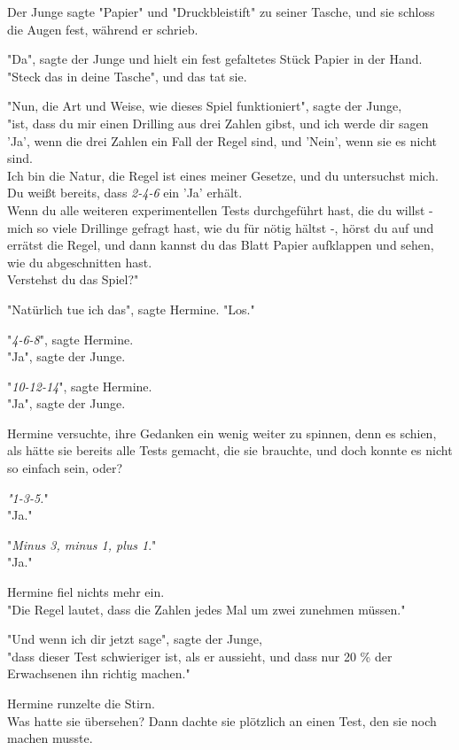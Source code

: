 {Der Junge sagte "Papier" und "Druckbleistift" zu seiner Tasche, und sie schloss die Augen fest, während er schrieb.

"Da", sagte der Junge und hielt ein fest gefaltetes Stück Papier in der Hand.\\ "Steck das in deine Tasche", und das tat sie.

"Nun, die Art und Weise, wie dieses Spiel funktioniert", sagte der Junge,\\ "ist, dass du mir einen Drilling aus drei Zahlen gibst, und ich werde dir sagen 'Ja', wenn die drei Zahlen ein Fall der Regel sind, und 'Nein', wenn sie es nicht sind.\\ Ich bin die Natur, die Regel ist eines meiner Gesetze, und du untersuchst mich. Du weißt bereits, dass \emph{2-4-6} ein 'Ja' erhält.\\ Wenn du alle weiteren experimentellen Tests durchgeführt hast, die du willst - mich so viele Drillinge gefragt hast, wie du für nötig hältst -, hörst du auf und errätst die Regel, und dann kannst du das Blatt Papier aufklappen und sehen, wie du abgeschnitten hast.\\ Verstehst du das Spiel?"

"Natürlich tue ich das", sagte Hermine. "Los."

"\emph{4-6-8}", sagte Hermine.\\ "Ja", sagte der Junge.

"\emph{10-12-14}", sagte Hermine.\\ "Ja", sagte der Junge.

Hermine versuchte, ihre Gedanken ein wenig weiter zu spinnen, denn es schien, als hätte sie bereits alle Tests gemacht, die sie brauchte, und doch konnte es nicht so einfach sein, oder?

\emph{"1-3-5.}"\\ "Ja."

"\emph{Minus 3, minus 1, plus 1}."\\ "Ja."

Hermine fiel nichts mehr ein.\\ "Die Regel lautet, dass die Zahlen jedes Mal um zwei zunehmen müssen."

"Und wenn ich dir jetzt sage", sagte der Junge,\\ "dass dieser Test schwieriger ist, als er aussieht, und dass nur 20 \% der Erwachsenen ihn richtig machen."

Hermine runzelte die Stirn.\\ Was hatte sie übersehen? Dann dachte sie plötzlich an einen Test, den sie noch machen musste.

}
